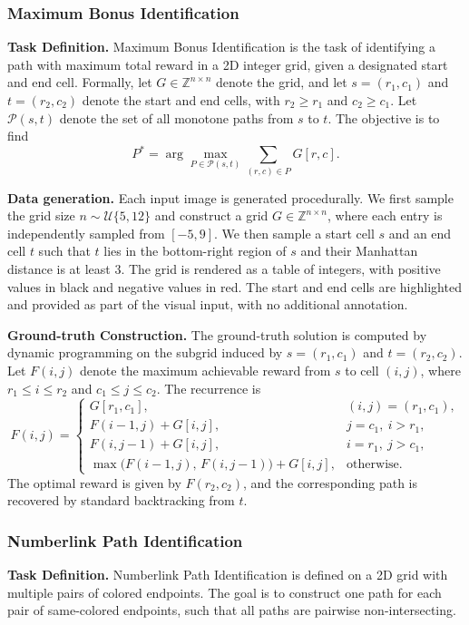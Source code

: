 \subsubsection{Maximum Bonus Identification }
\textbf{Task Definition.}
Maximum Bonus Identification is the task of identifying a path with
maximum total reward in a 2D integer grid, given a designated start and end
cell. Formally, let \(G \in \mathbb{Z}^{n \times n}\) denote the grid, and let
\(s = (r_1, c_1)\) and \(t = (r_2, c_2)\) denote the start and end cells,
with \(r_2 \ge r_1\) and \(c_2 \ge c_1\). Let \(\mathcal{P}(s,t)\) denote the
set of all monotone paths from \(s\) to \(t\). The objective is to find
\begin{equation}
P^* = \arg\max_{P \in \mathcal{P}(s,t)} \sum_{(r,c)\in P} G[r,c].
\end{equation}

\textbf{Data generation.}
Each input image is generated procedurally. We first sample the grid size
\(n \sim \mathcal{U}\{5,12\}\) and construct a grid
\(G \in \mathbb{Z}^{n \times n}\), where each entry is independently sampled
from \([-5,9]\). We then sample a start cell \(s\) and an end cell \(t\) such
that \(t\) lies in the bottom-right region of \(s\) and their Manhattan
distance is at least 3. The grid is rendered as a table of integers, with positive values in black and
negative values in red. The start and end cells are highlighted and provided
as part of the visual input, with no additional annotation.

\textbf{Ground-truth Construction.}
The ground-truth solution is computed by dynamic programming on the subgrid
induced by \(s=(r_1,c_1)\) and \(t=(r_2,c_2)\). Let
\(F(i,j)\) denote the maximum achievable reward from \(s\) to cell \((i,j)\),
where \(r_1 \le i \le r_2\) and \(c_1 \le j \le c_2\). The recurrence is
\begin{equation}
F(i,j)=
\begin{cases}
G[r_1,c_1], & (i,j)=(r_1,c_1),\\[4pt]
F(i-1,j)+G[i,j], & j=c_1,\ i>r_1,\\[4pt]
F(i,j-1)+G[i,j], & i=r_1,\ j>c_1,\\[4pt]
\max\bigl(F(i-1,j),\,F(i,j-1)\bigr)+G[i,j], & \text{otherwise}.
\end{cases}
\end{equation}
The optimal reward is given by \(F(r_2,c_2)\), and the corresponding path is
recovered by standard backtracking from \(t\).

\subsubsection{Numberlink Path Identification}
\textbf{Task Definition.}
Numberlink Path Identification is defined on a 2D grid with multiple pairs of
colored endpoints. The goal is to construct one path for each pair of
same-colored endpoints, such that all paths are pairwise non-intersecting.

